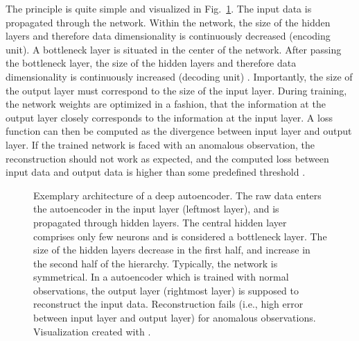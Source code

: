 \documentclass[conference]{IEEEtran}
\begin{document}
The principle is quite simple and visualized in Fig.~\ref{fig:auto}. The input data is propagated through the network. Within the network, the size of the hidden layers and therefore data dimensionality is continuously decreased (encoding unit). A bottleneck layer is situated in the center of the network. After passing the bottleneck layer, the size of the hidden layers and therefore data dimensionality is continuously increased (decoding unit) \cite{geron2019hands}. Importantly, the size of the output layer must correspond to the size of the input layer. During training, the network weights are optimized in a fashion, that the information at the output layer closely corresponds to the information at the input layer. A loss function can then be computed as the divergence between input layer and output layer. If the trained network is faced with an anomalous observation, the reconstruction should not work as expected, and the computed loss between input data and output data is higher than some predefined threshold \cite{geron2019hands,an2015variational}.


\begin{figure}[t]
\centering
%
\caption{Exemplary architecture of a deep autoencoder. The raw data enters the autoencoder in the input layer (leftmost layer), and is propagated through hidden layers. The central hidden layer comprises only few neurons and is considered a bottleneck layer. The size of the hidden layers decrease in the first half, and increase in the second half of the hierarchy. Typically, the network is symmetrical. In a autoencoder which is trained with normal observations, the output layer (rightmost layer) is supposed to reconstruct the input data. Reconstruction fails (i.e., high error between input layer and output layer) for anomalous observations. Visualization created with \cite{lenail2019nn}.}
\label{fig:auto}
\end{figure}
\end{document}
